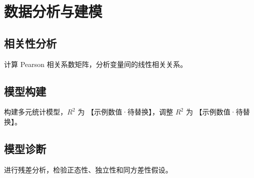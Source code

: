 \section{数据分析与建模}

\subsection{相关性分析}

计算 Pearson 相关系数矩阵，分析变量间的线性相关关系。

\subsection{模型构建}

构建多元统计模型，$R^2$ 为 【示例数值·待替换】，调整 $R^2$ 为 【示例数值·待替换】。

\subsection{模型诊断}

进行残差分析，检验正态性、独立性和同方差性假设。
